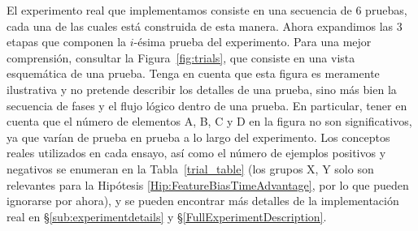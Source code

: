 El experimento real que implementamos consiste en una secuencia de 6 pruebas, cada una de las cuales está construida de esta manera. Ahora expandimos las 3 etapas que componen la $i$-ésima prueba del experimento. Para una mejor comprensión, consultar la Figura~\ref{fig:trials}, que consiste en una vista esquemática de una prueba. Tenga en cuenta que esta figura es meramente ilustrativa y no pretende describir los detalles de una prueba, sino más bien la secuencia de fases y el flujo lógico dentro de una prueba. En particular, tener en cuenta que el número de elementos {\sf A}, {\sf B}, {\sf C} y {\sf D} en la figura no son significativos, ya que varían de prueba en prueba a lo largo del experimento. Los conceptos reales utilizados en cada ensayo, así como el número de ejemplos positivos y negativos se enumeran en la Tabla~\ref{trial_table} (los grupos X, Y solo son relevantes para la Hipótesis \ref{Hip:FeatureBiasTimeAdvantage}, por lo que pueden ignorarse por ahora), y se pueden encontrar más detalles de la implementación real en \S\ref{sub:experimentdetails} y \S\ref{FullExperimentDescription}.  
%
